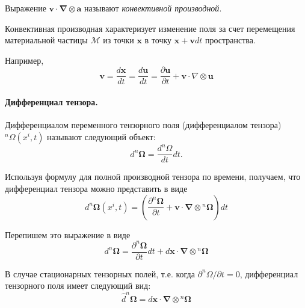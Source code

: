 \begin{definition*}
Выражение $\mathbf{v} \cdot \boldsymbol{\nabla} \otimes \mathbf{a}$ называют
\emph{конвективной производной}.
\end{definition*}

Конвективная производная характеризует изменение поля
за счет перемещения материальной частицы $\mathcal{M}$ из точки $\mathbf{x}$ в
точку $\mathbf{x}+\mathbf{v} d t$ пространства.

Например,
\begin{equation*}
\mathbf{v}=\frac{d \mathbf{x}}{d t}=\frac{d \mathbf{u}}{d t}=\frac{\partial \mathbf{u}}{\partial t}+\mathbf{v} \cdot \nabla \otimes \mathbf{u} 
\end{equation*}

\paragraph{Дифференциал тензора.}
\begin{definition*}
Дифференциалом переменного тензорного поля (дифференциалом тензора) ${ }^{n}
\Omega\left(x^{i}, t\right)$ называют следующий объект:
\begin{equation*}
d^{n} \boldsymbol{\Omega}=\frac{d^{n} \Omega}{d t} d t.
\end{equation*}
\end{definition*}

Используя формулу для полной производной тензора по времени, получаем, что дифференциал тензора можно представить в виде
\begin{equation*}
d^{n} \boldsymbol{\Omega}\left(x^{i}, t\right)=\left(\frac{\partial^{n} \boldsymbol{\Omega}}{\partial t}+\mathbf{v} \cdot \boldsymbol{\nabla} \otimes{ }^{n} \boldsymbol{\Omega}\right) d t 
\end{equation*}

Перепишем это выражение в виде
\begin{equation*}
d^{n} \boldsymbol{\Omega}=\frac{\partial^{n} \boldsymbol{\Omega}}{\partial t} d t+d \mathbf{x} \cdot \boldsymbol{\nabla} \otimes{ }^{n} \boldsymbol{\Omega}
\end{equation*}

В случае стационарных тензорных полей, т.е. когда $\partial^{n} \Omega / \partial t=0$, дифференциал тензорного поля имеет следующий вид:
\begin{equation*}
\widehat{d}^{n} \boldsymbol{\Omega}=d \mathbf{x} \cdot \boldsymbol{\nabla} \otimes{ }^{n} \boldsymbol{\Omega}
\end{equation*}

